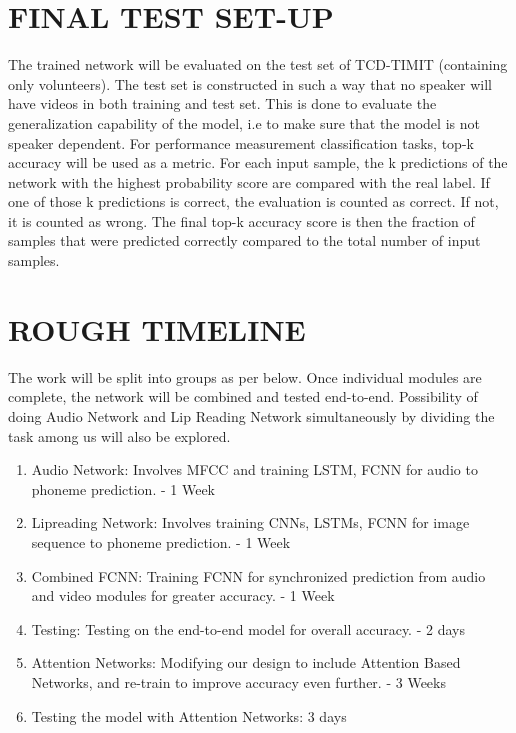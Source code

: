 \documentclass{article}
\begin{document}
\section{FINAL TEST SET-UP}
The trained network will be evaluated on the test set of TCD-TIMIT (containing only volunteers). The test set is constructed in such a way that no speaker will have videos in both training and test set. This is done to evaluate the generalization capability of the model, i.e to make sure that the model is not speaker dependent. For performance measurement classification tasks, top-k accuracy will be used as a metric. For each input sample, the k predictions of the network with the highest probability score are compared with the real label. If one of those k predictions is correct, the evaluation is counted as correct. If not, it is counted as wrong. The final top-k accuracy score is then the fraction of samples that were predicted correctly compared to the total number of input samples.



\section{ROUGH TIMELINE}
The work will be split into groups as per below. Once individual modules are complete, the network will be combined and tested end-to-end. Possibility of doing Audio Network and Lip Reading Network simultaneously by dividing the task among us will also be explored.
\begin{enumerate}
\item Audio Network: Involves MFCC and training LSTM, FCNN for audio to phoneme prediction. - 1 Week
\item Lipreading Network: Involves training CNNs, LSTMs, FCNN for image sequence to phoneme prediction. - 1 Week
\item Combined FCNN: Training FCNN for synchronized prediction from audio and video modules for greater accuracy. - 1 Week
\item Testing: Testing on the end-to-end model for overall accuracy. - 2 days
\item Attention Networks: Modifying our design to include Attention Based Networks, and re-train to improve accuracy even further. - 3 Weeks
\item Testing the model with Attention Networks: 3 days
\end{enumerate}
\end{document}
